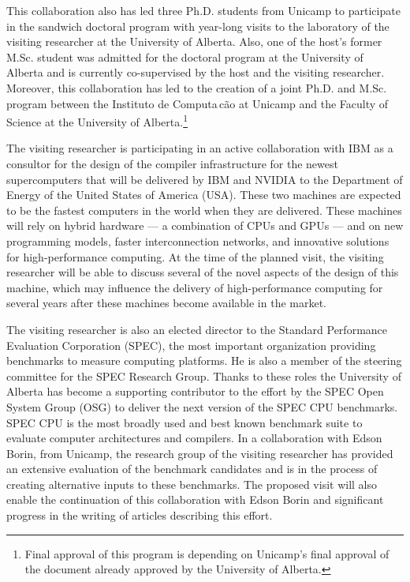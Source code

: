 \documentclass[10pt]{article}
\begin{document}
\begin{description}
This collaboration also has led three Ph.D. students from Unicamp to participate in the sandwich doctoral program with year-long visits to the laboratory of the visiting researcher at the University of Alberta. Also, one of the host's former M.Sc. student was admitted for the doctoral program at the University of Alberta and is currently co-supervised by the host and the visiting researcher. Moreover, this collaboration has led to the creation of a joint Ph.D. and M.Sc. program between  the Instituto de Computa\,{c}\~ao at Unicamp and the Faculty of Science at the University of Alberta.\footnote{Final approval of this program is depending on Unicamp's final approval of the document already approved by the University of Alberta.}

The visiting researcher is participating in an active collaboration with IBM as a consultor for the design of the compiler infrastructure for the newest supercomputers that will be delivered by IBM and NVIDIA to the Department of Energy of the United States of America (USA). These two machines are expected to be the fastest computers in the world when they are delivered. These machines will rely on hybrid hardware --- a combination of CPUs and GPUs --- and on new programming models, faster interconnection networks, and innovative solutions for high-performance computing. At the time of the planned visit, the visiting researcher will be able to discuss several of the novel aspects of the design of this machine, which may influence the delivery of high-performance computing for several years after these machines become available in the market.

The visiting researcher is also an elected director to the Standard Performance Evaluation Corporation (SPEC), the most important organization providing benchmarks to measure computing platforms. He is also a member of the steering committee for the SPEC Research Group. Thanks to these roles the University of Alberta has become a supporting contributor to the effort by the SPEC Open System Group (OSG) to deliver the next version of the SPEC CPU benchmarks. SPEC CPU is the most broadly used and best known benchmark suite to evaluate computer architectures and compilers. In a collaboration with Edson Borin, from Unicamp, the research group of the visiting researcher has provided an extensive evaluation of the benchmark candidates and is in the process of creating alternative inputs to these benchmarks. The proposed visit will also enable the continuation of this collaboration with Edson Borin and significant progress in the writing of articles describing this effort.



\end{description}
\end{document}
